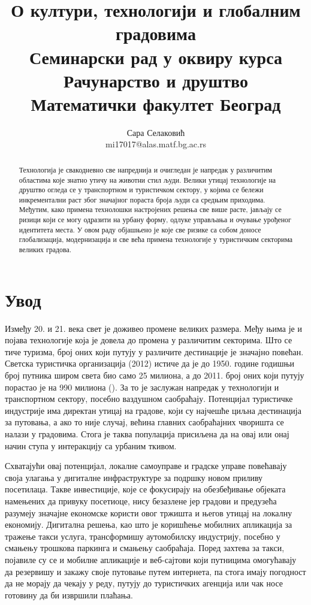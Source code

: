 \documentclass{article}
\title{О култури, технологији и глобалним градовима\\
    \small{Семинарски рад у оквиру курса\\Рачунарство и друштво\\Математички факултет Београд}}
\author{Сара Селаковић\\mi17017@alas.matf.bg.ac.rs}
\begin{document}
\maketitle

\begin{abstract}
Технологија је свакодневно све напреднија и очигледан је напредак у различитим областима које знатно утичу на животни стил људи. Велики утицај технологије на друштво огледа се у транспортном и туристичком сектору, у којима се бележи инкрементални раст због значајног пораста броја људи са средњим приходима. Међутим, како примена технолошки настројених решења све више расте, јављају се ризици који се могу одразити на урбану форму, одлуке управљања и очување урођеног идентитета места. У овом раду објашњено је које све ризике са собом доносе глобализација, модернизација и све већа примена технологије у туристичким секторима великих градова.

\end{abstract}

\newpage
\tableofcontents
\newpage

\section{Увод}

Између 20. и 21. века свет је доживео промене великих размера. Међу њима је и појава технологије која је довела до промена у различитим секторима. Што се тиче туризма, број оних који путују у различите дестинације је значајно повећан. Светска туристичка организација (2012) истиче да је до 1950. године годишњи број путника широм света био само 25 милиона, а до 2011. број оних који путују порастао је на 990 милиона (\cite{wto}). За то је заслужан напредак у технологији и транспортном сектору, посебно ваздушном саобраћају. Потенцијал туристичке индустрије има директан утицај на градове, који су најчешће циљна дестинација за путовања, а ако то није случај, већина главних саобраћајних чворишта се налази у градовима. Стога је таква популација присиљена да на овај или онај начин ступа у интеракцију са урбаним ткивом.

Схватајући овај потенцијал, локалне самоуправе и градске управе повећавају своја улагања у дигиталне инфраструктуре за подршку новом приливу посетилаца. Такве инвестиције, које се фокусирају на обезбеђивање објеката намењених да привуку посетиоце, нису безазлене јер градови и предузећа разумеју значајне економске користи овог тржишта и његов утицај на локалну економију. Дигитална решења, као што је коришћење мобилних апликација за тражење такси услуга, трансформишу аутомобилску индустрију, посебно у смањењу трошкова паркинга и смањењу саобраћаја. Поред захтева за такси, појавиле су се и мобилне апликације и веб-сајтови који путницима омогућавају да резервишу и закажу своје путовање путем интернета, па стога имају погодност да не морају да чекају у реду, путују до туристичких агенција или чак носе готовину да би извршили плаћања.
\end{document}
